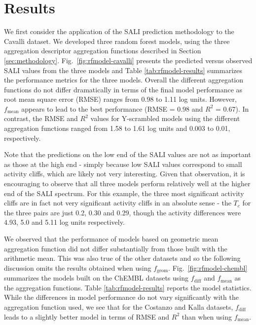 \documentclass[letterpaper, 12pt]{article}
\begin{document}
\section{Results}
\label{sec:applications}
We first consider the application of the SALI prediction methodology to the Cavalli dataset. We
developed three random forest models, using the three aggregation descriptor aggregation functions
described in Section \ref{sec:methodology}. Fig.~\ref{fig:rfmodel-cavalli} presents the predicted
versus observed SALI values from the three models and Table \ref{tab:rfmodel-results} summarizes the
performance metrics for the three models. Overall the different aggregation functions do not differ
dramatically in terms of the final model performance as root mean square error (RMSE) ranges from
0.98 to 1.11 log units. However, $f_{\textrm{mean}}$ appears to lead to the best performance (RMSE = 0.98 and
$R^2$ = 0.67). In contrast, the RMSE and $R^2$ values for Y-scrambled\cite{Rucker:2007aa} models
using the different aggregation functions ranged from 1.58 to 1.61 log units and 0.003 to 0.01, respectively.

Note that the predictions on the low end of the SALI values are not as important as those at the
high end - simply because low SALI values correspond to small activity cliffs, which are likely not
very interesting. Given that observation, it is encouraging to observe that all three models perform
relatively well at the higher end of the SALI spectrum. For this example, the three most significant
activity cliffs are in fact not very significant activity cliffs in an absolute sense - the $T_c$
for the three pairs are just 0.2, 0.30 and 0.29, though the activity differences were 4.93, 5.0 and
5.11 log units respectively.

We observed that the performance of models based on geometric mean aggregation function did not
differ substantially from those built with the arithmetic mean. This was also true of the other
datasets and so the following discussion omits the results obtained when using
$f_{\textrm{geom}}$. Fig.~\ref{fig:rfmodel-chembl} summarizes the models built on the ChEMBL
datasets using $f_{\textrm{diff}}$ and $f_{\textrm{mean}}$ as the aggregation functions. Table
\ref{tab:rfmodel-results} reports the model statistics.  While the differences in model performance
do not vary significantly with the aggregation function used, we see that for the Costanzo and Kalla
datasets, $f_{\textrm{diff}}$ leads to a slightly better model in terms of RMSE and $R^2$ than when
using $f_{\textrm{mean}}$.
\end{document}
